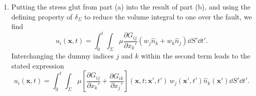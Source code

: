 \documentclass[a4paper,10pt]{paper}
\begin{document}
\begin{enumerate}
\begin{enumerate}
\begin{equation*}
    \end{equation*}
    where all functions in the integrands, including the normal $\hat{\mathbf{n}}'$ to $\partial M$, are evaluated at the primed variables. Applying the product rule and the divergence theorem to the volume integral gives
    \begin{equation*}
        -\int_{M}G_{ij}\frac{\partial\overline{S}_{jl}}{\partial x_{l}'}\dd^{3}\mathbf{x}'=-\int_{\partial M}G_{ij}\overline{S}_{jl}\hat{n}_{l}'\dd S'+\int_{M}\frac{\partial G_{ij}}{\partial x_{l}'}\overline{S}_{jl}\dd^{3}\mathbf{x}',
    \end{equation*}
    and the surface term exactly cancels the contribution from the effective traction. Relabelling the dummy index $l$ as $k$, we are left with
    \begin{equation*}
        u_{i}(\mathbf{x},t)=\int_{0}^{t}\int_{M}\frac{\partial G_{ij}}{\partial x_{k}'}(\mathbf{x},t;\mathbf{x}',t')\overline{S}_{jk}(\mathbf{x}',t')\dd^{3}\mathbf{x}'\dd t',
    \end{equation*}
    as required. Note that the integration by parts remains valid when the stress glut is a distribution, such as that of an idealised fault, with the integrals then understood in the sense of generalised functions. The effective body force and traction have combined into a single term, and the displacement is seen to depend on the stress glut only through its integral against the strain of the Green function.
    \item Putting the stress glut from part (a) into the result of part (b), and using the defining property of $\delta_{\Sigma}$ to reduce the volume integral to one over the fault, we find
    \begin{equation*}
        u_{i}(\mathbf{x},t)=\int_{0}^{t}\int_{\Sigma}\mu\frac{\partial G_{ij}}{\partial x_{k}'}(w_{j}\hat{n}_{k}+w_{k}\hat{n}_{j})\dd S'\dd t'.
    \end{equation*}
    Interchanging the dummy indices $j$ and $k$ within the second term leads to the stated expression
    \begin{equation*}
        u_{i}(\mathbf{x},t)=\int_{0}^{t}\int_{\Sigma}\mu\left[\frac{\partial G_{ij}}{\partial x_{k}'}+\frac{\partial G_{ik}}{\partial x_{j}'}\right](\mathbf{x},t;\mathbf{x}',t')\,w_{j}(\mathbf{x}',t')\hat{n}_{k}(\mathbf{x}')\dd S'\dd t'.
    \end{equation*}

\end{enumerate}
\end{enumerate}
\end{document}
